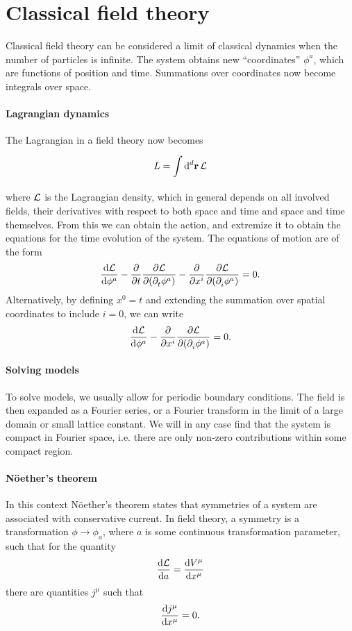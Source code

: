 \section{Classical field theory}

Classical field theory can be considered a limit of classical dynamics when the number of particles is infinite. The system obtains new ``coordinates'' $\phi^{a}$, which are functions of position and time. Summations over coordinates now become integrals over space.

\paragraph{Lagrangian dynamics}
The Lagrangian in a field theory now becomes
\begin{align*}
	L = \int\limits_{}^{}\dd[d]{\vb{r}}\mathcal{L}
\end{align*}
where $\mathcal{L}$ is the Lagrangian density, which in general depends on all involved fields, their derivatives with respect to both space and time and space and time themselves. From this we can obtain the action, and extremize it to obtain the equations for the time evolution of the system. The equations of motion are of the form
\begin{align*}
	\dv{\mathcal{L}}{\phi^{a}} - \pdv{t}\pdv{\mathcal{L}}{(\partial^{}_{t}\phi^{a})} - \pdv{x^{i}}\pdv{\mathcal{L}}{(\partial^{}_{i}\phi^{a})} = 0.
\end{align*}
Alternatively, by defining $x^{0} = t$ and extending the summation over spatial coordinates to include $i = 0$, we can write
\begin{align*}
	\dv{\mathcal{L}}{\phi^{a}} - \pdv{x^{i}}\pdv{\mathcal{L}}{(\partial^{}_{i}\phi^{a})} = 0.
\end{align*}

\paragraph{Solving models}
To solve models, we usually allow for periodic boundary conditions. The field is then expanded as a Fourier series, or a Fourier transform in the limit of a large domain or small lattice constant. We will in any case find that the system is compact in Fourier space, i.e. there are only non-zero contributions within some compact region.

\paragraph{Nöether's theorem}
In this context Nöether's theorem states that symmetries of a system are associated with conservative current. In field theory, a symmetry is a transformation $\phi\to\phi_{a}$, where $a$ is some continuous transformation parameter, such that for the quantity
\begin{align*}
	\dv{\mathcal{L}}{a} = \dv{V^{\mu}}{x^{\mu}}
\end{align*}
there are quantities $j^{\mu}$ such that
\begin{align*}
	\dv{j^{\mu}}{x^{\mu}} = 0.
\end{align*}

